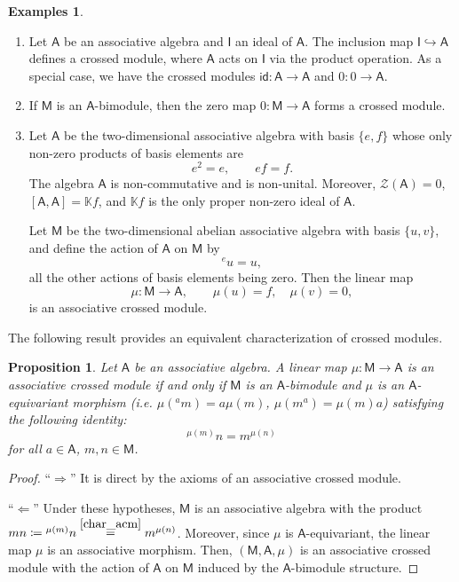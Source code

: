 \documentclass[12pt,reqno]{amsart}
\theoremstyle{plain}
\newtheorem{proposition}[theorem]{Proposition}
\theoremstyle{definition}
\newtheorem{examples}[theorem]{Examples}
\theoremstyle{remark}
\newcommand{\K}{\ensuremath{\mathbb{K}}}
\newcommand{\A}{\ensuremath{\mathsf{A}}}
\newcommand{\id}{\ensuremath{\mathsf{id}}}
\newcommand{\MM}{\ensuremath{\mathsf{M}}}
\newcommand{\II}{\ensuremath{\mathsf{I}}}
\newcommand{\ZZ}{\ensuremath{\mathscr{Z}}}
\numberwithin{equation}{section}
\begin{document}
 \begin{examples} \label{E:CM} \hfill
 	\begin{enumerate}
 		\item Let $\A$ be an associative algebra and $\II$ an  ideal of $\A$.  The inclusion map  $\II \hookrightarrow \A$ defines a crossed module,
 		 where $\A$ acts on $\II$ via the product operation. As a special case, we have the crossed modules $ \id \colon\A \to \A$ and
 		$ 0 \colon 0 \to \A$.
 		\item  If $\MM$ is an $\A$-bimodule, then  the zero map $ 0 \colon \MM \to \A$ forms a crossed module.
 		\item Let $\A$ be the two-dimensional associative algebra with basis $\{e,f\}$ whose only non-zero products of basis elements are
 		\[
 		e^2=e, \qquad ef=f.
 		\]
 		 The algebra $\A$ is non-commutative and is non-unital. Moreover, $\ZZ(\A)=0$, $[\A,\A]=\K f$, and $\K f$ is the only proper non-zero ideal of $\A$.

 		Let $\MM$ be the two-dimensional abelian associative algebra with basis $\{u,v\}$, and define the action of $\A$ on $\MM$ by
 		\[
 		{}^e u=u,
 		\]
 		all the other actions of basis elements being zero. Then the linear map
 		\[
 		\mu \colon \MM\longrightarrow \A, \qquad \mu(u)=f, \quad \mu(v)=0,
 		\]
 		is an associative crossed module. 
 	\end{enumerate}
 \end{examples}
 
 The following result provides an equivalent characterization of crossed modules.
 \begin{proposition}
 	Let $\A$ be an associative algebra.	A linear map  $\mu \colon \MM\to\A$ is an associative crossed module if and only if $\MM$ is an $\A$-bimodule and $\mu$ is an $\A$-equivariant morphism (i.e.  
 	$\mu ({}^a m)=a  \mu(m)$, $\mu (m^a)=\mu(m) a$)  satisfying the following identity:
 	\begin{equation}\label{char_acm}
 	{}^{\mu(m)} n = m^{\mu(n)}
 	\end{equation}
 	for all $a\in\A$, $m, n\in \MM$.	
 \end{proposition}
 \begin{proof}``$\Longrightarrow$'' It is direct by the axioms of an associative crossed module.
 	
 	``$\Longleftarrow$'' Under these hypotheses, $\MM$ is an associative algebra with the product $mn\coloneqq{}^{\mu(m)}n\stackrel{\eqref{char_acm}}{=}m^{\mu(n)}$. Moreover, since $\mu$ is $\A$-equivariant, the linear map $\mu$ is an associative morphism. Then, $(\MM,\A,\mu)$ is an associative crossed module with the action of $\A$ on $\MM$ induced by the $\A$-bimodule structure.
 \end{proof}
 
\end{document}
